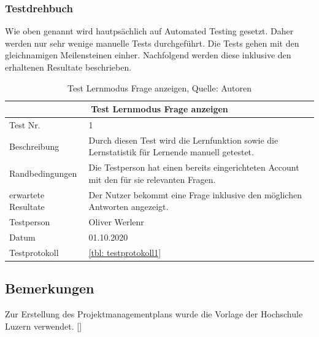 \subsubsection{Testdrehbuch}\label{testsvonmeilensteine}
Wie oben genannt wird hautpsächlich auf Automated Testing gesetzt.
Daher werden nur sehr wenige manuelle Tests durchgeführt.
Die Tests gehen mit den gleichnamigen Meilensteinen einher.
Nachfolgend werden diese inklusive den erhaltenen Resultate beschrieben.

\begin{table}[H]
\begin{tabularx}{\textwidth}{lX}
  \hline
  \multicolumn{2}{|c|}{Test Lernmodus Frage anzeigen} \\
  \hline
  Test Nr. & 1\\
  Beschreibung & Durch diesen Test wird die Lernfunktion sowie die Lernstatistik für Lernende manuell getestet.\\
  Randbedingungen & Die Testperson hat einen bereits eingerichteten Account mit den für sie relevanten Fragen.\\
  erwartete Resultate & Der Nutzer bekommt eine Frage inklusive den möglichen Antworten angezeigt.  \\
  Testperson & Oliver Werlenr \\
  Datum & 01.10.2020 \\
  Testprotokoll & \ref{tbl: testprotokoll1}\\
   \hline
\end{tabularx}
\caption{ \label{tbl: Test Lernmodus Frage anzeigen}Test Lernmodus Frage anzeigen, Quelle: Autoren}
\end{table}

\subsection{Bemerkungen}
Zur Erstellung des Projektmanagementplans wurde die Vorlage der Hochschule Luzern verwendet. [\cite{pmpHSLU}]
\newpage
